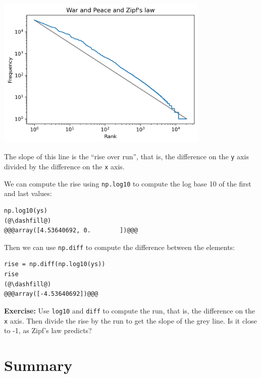 \begin{center}
\includegraphics[width=4in]{chapters/06_plotting_files/06_plotting_84_0.png}
\end{center}

The slope of this line is the ``rise over run'', that is, the difference
on the \passthrough{\lstinline!y!} axis divided by the difference on the
\passthrough{\lstinline!x!} axis.

We can compute the rise using \passthrough{\lstinline!np.log10!} to
compute the log base 10 of the first and last values:

\begin{lstlisting}[]
np.log10(ys)
(@\dashfill@)
@@@array([4.53640692, 0.        ])@@@
\end{lstlisting}

Then we can use \passthrough{\lstinline!np.diff!} to compute the
difference between the elements:

\begin{lstlisting}[]
rise = np.diff(np.log10(ys))
rise
(@\dashfill@)
@@@array([-4.53640692])@@@
\end{lstlisting}

\textbf{Exercise:} Use \passthrough{\lstinline!log10!} and
\passthrough{\lstinline!diff!} to compute the run, that is, the
difference on the \passthrough{\lstinline!x!} axis. Then divide the rise
by the run to get the slope of the grey line. Is it close to -1, as
Zipf's law predicts?

\hypertarget{summary}{%
\section{Summary}\label{summary}}

